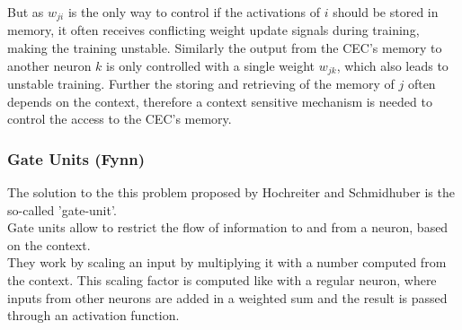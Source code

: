 \documentclass[twoside,a4paper,10pt,DIV=12,BCOR=12mm]{scrartcl}
\begin{document}
But as $w_{ji}$ is the only way to control if the activations of $i$ should be stored in memory, it often receives conflicting weight update signals during training, making the training unstable. Similarly the output from the CEC's memory to another neuron $k$ is only controlled with a single weight $w_{jk}$, which also leads to unstable training. Further the storing and retrieving of the memory of $j$ often depends on the context, therefore a context sensitive mechanism is needed to control the access to the CEC's memory.\cite{hochreiter1997lstm}

\subsubsection{Gate Units (Fynn)}
The solution to the this problem proposed by Hochreiter and Schmidhuber is the so-called 'gate-unit'.\cite{hochreiter1997lstm} \\
Gate units allow to restrict the flow of information to and from a neuron, based on the context.\\
They work by scaling an input by multiplying it with a number computed from the context. This scaling factor is computed like with a regular neuron, where inputs from other neurons are added in a weighted sum and the result is passed through an activation function.\cite{hochreiter1997lstm}
\end{document}
